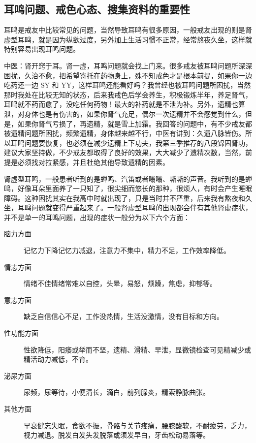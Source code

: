 \documentclass{ctexart}
\begin{document}
\subsection{耳鸣问题、戒色心态、搜集资料的重要性}

耳鸣是戒友中比较常见的问题，当然导致耳鸣有很多原因，一般戒友出现的则是肾虚型耳鸣，就是因为纵欲过度，另外加上生活习惯不正常，经常熬夜久坐，这样就特别容易出现耳鸣问题。

中医：肾开窍于耳。肾一虚，耳鸣问题就会找上门来。很多戒友被耳鸣问题所深深困扰，久治不愈，把希望寄托在药物身上，殊不知戒色才是根本前提，如果你一边吃药还一边 SY 和 YY，这样耳鸣还能看好吗？我曾经也被耳鸣问题所困扰，当然那时我处在比较无知的状态，后来我戒色后学会养生，积极锻炼半年，养足肾气，耳鸣就不药而愈了，没吃任何药物！最大的补药就是不泄为补。另外，遗精也算泄，对身体也是有伤害的，如果你肾气充足，偶尔一次遗精并不会感觉到什么，但是，如果你肾气亏损了，再遗精，就是雪上加霜。我回答的问题中，有不少戒友都被遗精问题所困扰，频繁遗精，身体越来越不行，中医有讲到：久遗八脉皆伤。所以耳鸣问题要恢复，也必须在减少遗精上下功夫，我第三季推荐的八段锦固肾功，建议大家坚持做，不少戒友都取得了良好的效果，大大减少了遗精次数，当然，前提是必须找对拉紧感，并且杜绝其他导致遗精的因素。

肾虚型耳鸣，一般患者听到的是蝉鸣、汽笛或者嗡嗡、嘶嘶的声音。我听到的是蝉鸣，好像耳朵里面养了一只知了，很尖细而悠长的那种，很烦人，有时会产生睡眠障碍。这种困扰其实在我高中时就出现了，只是当时并不严重，后来我有熬夜和久坐，耳鸣问题就变得严重起来了。一般肾虚型耳鸣的出现都会伴有其他肾虚症状，并不是单一的耳鸣问题，出现的症状一般分为以下六个方面：

\begin{description}
    \item[脑力方面] 记忆力下降记忆力减退，注意力不集中，精力不足，工作效率降低。
    \item[情志方面] 情绪不佳情绪常难以自控，头晕，易怒，烦躁，焦虑，抑郁等。
    \item[意志方面] 缺乏自信信心不足，工作没热情，生活没激情，没有目标和方向。
    \item[性功能方面] 性欲降低，阳痿或举而不坚，遗精、滑精、早泄，显微镜检查可见精减少或精活动力减低，不育。
    \item[泌尿方面] 尿频，尿等待，小便清长，滴白，前列腺炎，精索静脉曲张。
    \item[其他方面] 早衰健忘失眠，食欲不振，骨骼与关节疼痛，腰膝酸软，不耐疲劳，乏力，视力减退。脱发白发头发脱落或须发早白，牙齿松动易落等。
\end{description}
\end{document}
